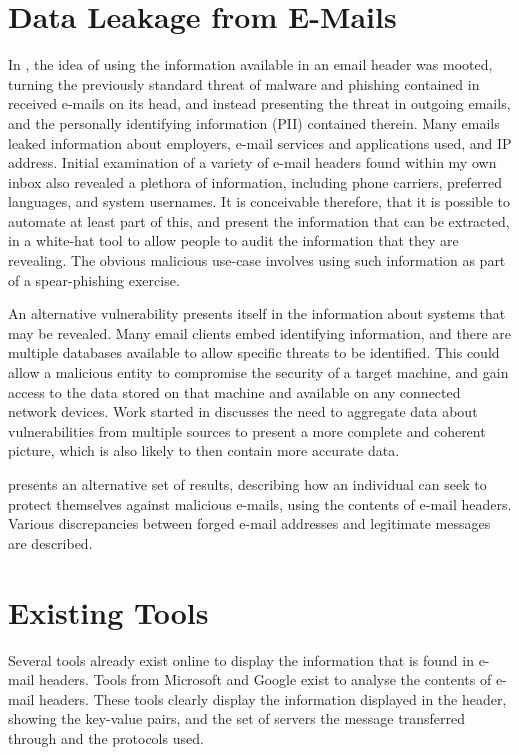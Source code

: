 \section{Data Leakage from E-Mails}

In \cite{nurse2015investigating}, the idea of using the information available
in an email header was mooted, turning the previously standard threat of
malware and phishing contained in received e-mails on its head, and instead
presenting the threat in outgoing emails, and the personally identifying
information (PII) contained therein.  Many emails leaked information about
employers, e-mail services and applications used, and IP address.  Initial
examination of a variety of e-mail headers found within my own inbox also
revealed a plethora of information, including phone carriers, preferred
languages, and system usernames.  It is conceivable therefore, that it is
possible to automate at least part of this, and present the information that
can be extracted, in a white-hat tool to allow people to audit the information
that they are revealing.  The obvious malicious use-case involves using such
information as part of a spear-phishing exercise.

An alternative vulnerability presents itself in the information about systems
that may be revealed.  Many email clients embed identifying information, and
there are multiple databases available to allow specific threats to be
identified.  This could allow a malicious entity to compromise the security of
a target machine, and gain access to the data stored on that machine and
available on any connected network devices.  Work started in
\cite{joshi2013extracting} discusses the need to aggregate data about
vulnerabilities from multiple sources to present a more complete and coherent
picture, which is also likely to then contain more accurate data.

\cite{Al-zarouni_tracinge-mail} presents an alternative set of results,
describing how an individual can seek to protect themselves against malicious
e-mails, using the contents of e-mail headers.  Various discrepancies between
forged e-mail addresses and legitimate messages are described.

\section{Existing Tools}

Several tools already exist online to display the information that is found in
e-mail headers.  Tools from Microsoft and Google exist to analyse the contents
of e-mail headers.  These tools clearly display the information displayed in
the header, showing the key-value pairs, and the set of servers the message
transferred through and the protocols used.  

